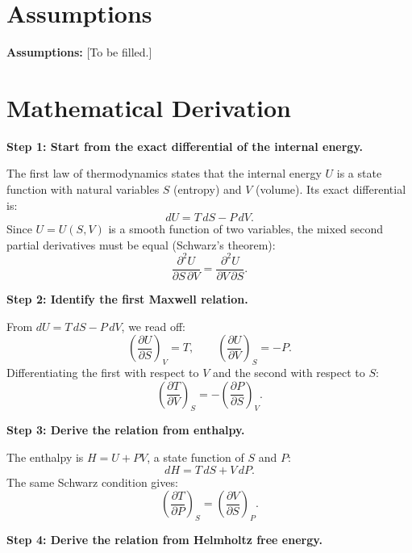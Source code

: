 \section*{Assumptions}

\textbf{Assumptions:} [To be filled.]

\section*{Mathematical Derivation}

\textbf{Step 1: Start from the exact differential of the internal energy.}

The first law of thermodynamics states that the internal energy $U$ is a state function with natural variables $S$ (entropy) and $V$ (volume). Its exact differential is:
\begin{equation}
dU = T\,dS - P\,dV.
\end{equation}
Since $U = U(S,V)$ is a smooth function of two variables, the mixed second partial derivatives must be equal (Schwarz's theorem):
\begin{equation}
\frac{\partial^{2}U}{\partial S\,\partial V} = \frac{\partial^{2}U}{\partial V\,\partial S}.
\end{equation}

\textbf{Step 2: Identify the first Maxwell relation.}

From $dU = T\,dS - P\,dV$, we read off:
\begin{equation}
\left(\frac{\partial U}{\partial S}\right)_{V} = T, \qquad \left(\frac{\partial U}{\partial V}\right)_{S} = -P.
\end{equation}
Differentiating the first with respect to $V$ and the second with respect to $S$:
\begin{equation}
\left(\frac{\partial T}{\partial V}\right)_{S} = -\left(\frac{\partial P}{\partial S}\right)_{V}.
\end{equation}

\textbf{Step 3: Derive the relation from enthalpy.}

The enthalpy is $H = U + PV$, a state function of $S$ and $P$:
\begin{equation}
dH = T\,dS + V\,dP.
\end{equation}
The same Schwarz condition gives:
\begin{equation}
\left(\frac{\partial T}{\partial P}\right)_{S} = \left(\frac{\partial V}{\partial S}\right)_{P}.
\end{equation}

\textbf{Step 4: Derive the relation from Helmholtz free energy.}

